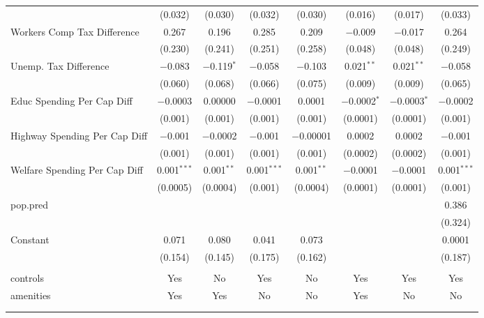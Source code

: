 \begin{table}[!htbp]
\begin{tabular}{@{\extracolsep{5pt}}lccccccc}
  & (0.032) & (0.030) & (0.032) & (0.030) & (0.016) & (0.017) & (0.033) \\ 
  Workers Comp Tax Difference & 0.267 & 0.196 & 0.285 & 0.209 & $-$0.009 & $-$0.017 & 0.264 \\ 
  & (0.230) & (0.241) & (0.251) & (0.258) & (0.048) & (0.048) & (0.249) \\ 
  Unemp. Tax Difference & $-$0.083 & $-$0.119$^{*}$ & $-$0.058 & $-$0.103 & 0.021$^{**}$ & 0.021$^{**}$ & $-$0.058 \\ 
  & (0.060) & (0.068) & (0.066) & (0.075) & (0.009) & (0.009) & (0.065) \\ 
  Educ Spending Per Cap Diff & $-$0.0003 & 0.00000 & $-$0.0001 & 0.0001 & $-$0.0002$^{*}$ & $-$0.0003$^{*}$ & $-$0.0002 \\ 
  & (0.001) & (0.001) & (0.001) & (0.001) & (0.0001) & (0.0001) & (0.001) \\ 
  Highway Spending Per Cap Diff & $-$0.001 & $-$0.0002 & $-$0.001 & $-$0.00001 & 0.0002 & 0.0002 & $-$0.001 \\ 
  & (0.001) & (0.001) & (0.001) & (0.001) & (0.0002) & (0.0002) & (0.001) \\ 
  Welfare Spending Per Cap Diff & 0.001$^{***}$ & 0.001$^{**}$ & 0.001$^{***}$ & 0.001$^{**}$ & $-$0.0001 & $-$0.0001 & 0.001$^{***}$ \\ 
  & (0.0005) & (0.0004) & (0.001) & (0.0004) & (0.0001) & (0.0001) & (0.001) \\ 
  pop.pred &  &  &  &  &  &  & 0.386 \\ 
  &  &  &  &  &  &  & (0.324) \\ 
  Constant & 0.071 & 0.080 & 0.041 & 0.073 &  &  & 0.0001 \\ 
  & (0.154) & (0.145) & (0.175) & (0.162) &  &  & (0.187) \\ 
 \hline \\[-1.8ex] 
controls & Yes & No & Yes & No & Yes & Yes & Yes \\ 
amenities & Yes & Yes & No & No & Yes & No & No \\ 
\hline \\[-1.8ex] 
\hline 
\hline \\[-1.8ex] 
\end{tabular} 
\end{table} 
